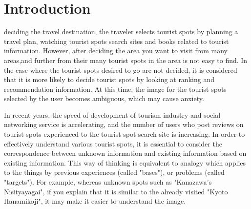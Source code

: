 \documentclass[journal]{IAENGtran}
\begin{document}
\section{Introduction}
\label{sec:Introduction}
 deciding the travel destination, the traveler selects tourist spots by planning a travel plan, watching tourist spots search sites and books related to tourist information.
However, after deciding the area you want to visit from many areas,and further from their many tourist spots in the area is not easy to find.
In the case where the tourist spots desired to go are not decided, it is considered that it is more likely to decide tourist spots by looking at ranking and recommendation information.
At this time, the image for the tourist spots selected by the user becomes ambiguous, which may cause anxiety.


In recent years, the speed of development of tourism industry and social networking service is accelerating, and the number of users who post reviews on tourist spots experienced to the tourist spot search site is increasing.
In order to effectively understand various tourist spots, it is essential to consider the correspondence between unknown information and existing information based on existing information.
This way of thinking is equivalent to analogy which applies to the things by previous experiences (called "bases"), or problems (called "targets").
For example, whereas unknown spots such as "Kanazawa's Nisityayagai", if you explain that it is similar to the already visited "Kyoto Hanamikoji", it may make it easier to understand the image.
\end{document}
